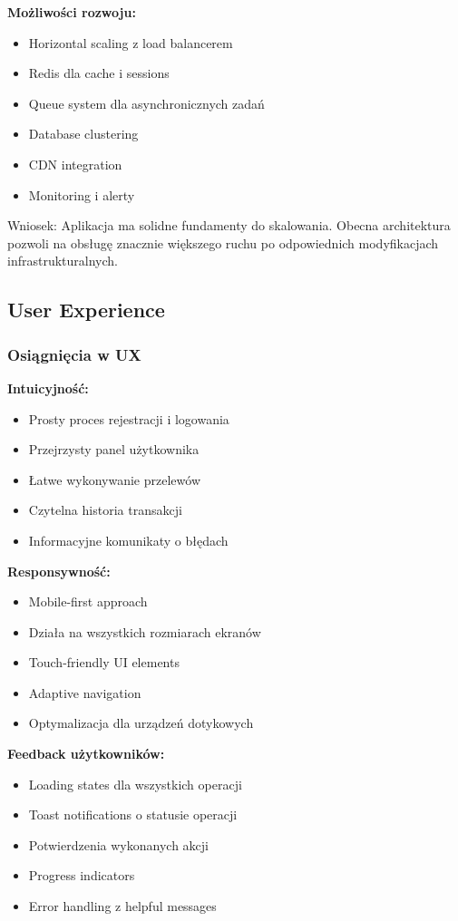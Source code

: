 \documentclass[12pt,a4paper]{article}
\begin{document}
    \textbf{Możliwości rozwoju:}
    \begin{itemize}
        \item Horizontal scaling z load balancerem
        \item Redis dla cache i sessions
        \item Queue system dla asynchronicznych zadań
        \item Database clustering
        \item CDN integration
        \item Monitoring i alerty
    \end{itemize}

    Wniosek: Aplikacja ma solidne fundamenty do skalowania. Obecna architektura pozwoli na obsługę znacznie większego ruchu po odpowiednich modyfikacjach infrastrukturalnych.

    \subsection{User Experience}

    \subsubsection{Osiągnięcia w UX}

    \textbf{Intuicyjność:}
    \begin{itemize}
        \item Prosty proces rejestracji i logowania
        \item Przejrzysty panel użytkownika
        \item Łatwe wykonywanie przelewów
        \item Czytelna historia transakcji
        \item Informacyjne komunikaty o błędach
    \end{itemize}

    \textbf{Responsywność:}
    \begin{itemize}
        \item Mobile-first approach
        \item Działa na wszystkich rozmiarach ekranów
        \item Touch-friendly UI elements
        \item Adaptive navigation
        \item Optymalizacja dla urządzeń dotykowych
    \end{itemize}

    \textbf{Feedback użytkowników:}
    \begin{itemize}
        \item Loading states dla wszystkich operacji
        \item Toast notifications o statusie operacji
        \item Potwierdzenia wykonanych akcji
        \item Progress indicators
        \item Error handling z helpful messages
    \end{itemize}
\end{document}
